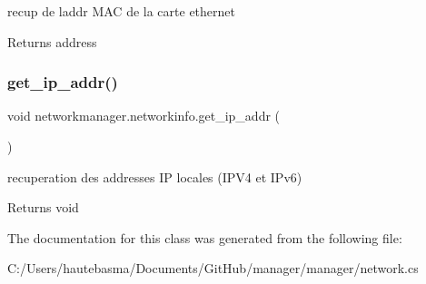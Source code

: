 recup de l\textquotesingle{}addr M\+AC de la carte ethernet 

\begin{DoxyReturn}{Returns}
address
\end{DoxyReturn}
\mbox{\label{classnetworkmanager_1_1networkinfo_accd33e70bd87b921e0094e4647f71c15}} 
\subsubsection{\texorpdfstring{get\+\_\+ip\+\_\+addr()}{get\_ip\_addr()}}
{\footnotesize\ttfamily void networkmanager.\+networkinfo.\+get\+\_\+ip\+\_\+addr (\begin{DoxyParamCaption}{ }\end{DoxyParamCaption})}



recuperation des addresses IP locales (I\+P\+V4 et I\+Pv6) 

\begin{DoxyReturn}{Returns}
void
\end{DoxyReturn}


The documentation for this class was generated from the following file\+:\begin{DoxyCompactItemize}
\item 
C\+:/\+Users/hautebasma/\+Documents/\+Git\+Hub/manager/manager/network.\+cs\end{DoxyCompactItemize}
